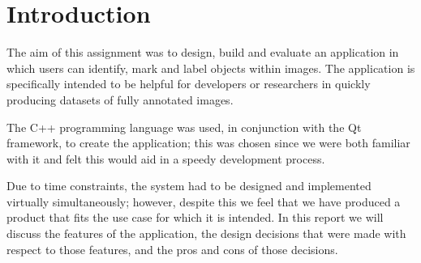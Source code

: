 \section{Introduction}
The aim of this assignment was to design, build and evaluate an application in which users can identify, mark and label objects within images.  The application is specifically intended to be helpful for developers or researchers in quickly producing datasets of fully annotated images.

The C++ programming language was used, in conjunction with the Qt framework\cite{QtFramework}, to create the application; this was chosen since we were both familiar with it and felt this would aid in a speedy development process.

Due to time constraints, the system had to be designed and implemented virtually simultaneously; however, despite this we feel that we have produced a product that fits the use case for which it is intended.  In this report we will discuss the features of the application, the design decisions that were made with respect to those features, and the pros and cons of those decisions.
